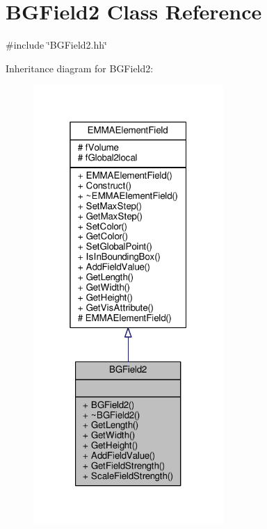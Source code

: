 \hypertarget{classBGField2}{}\section{B\+G\+Field2 Class Reference}
\label{classBGField2}


{\ttfamily \#include \char`\"{}B\+G\+Field2.\+hh\char`\"{}}



Inheritance diagram for B\+G\+Field2\+:
\nopagebreak
\begin{figure}[H]
\begin{center}
\leavevmode
\includegraphics[width=205pt]{classBGField2__inherit__graph}
\end{center}
\end{figure}


